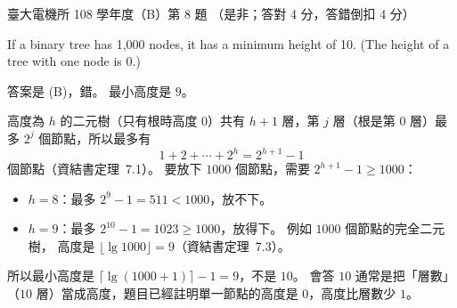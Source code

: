 \begin{pastexam}[label={px:ntu-108-ee-dsb-08}]{臺大電機所 108 學年度（B）第 8 題}
（是非；答對 4 分，答錯倒扣 4 分）

If a binary tree has 1,000 nodes, it has a minimum height of 10. (The height of a tree with one
node is 0.)
\end{pastexam}

\begin{pastsoln}
答案是 (B)，錯。 最小高度是 $9$。

高度為 $h$ 的二元樹（只有根時高度 $0$）共有 $h + 1$ 層，第 $j$ 層（根是第 $0$ 層）最多 $2^j$
個節點，所以最多有
\[
1 + 2 + \cdots + 2^h = 2^{h+1} - 1
\]
個節點（資結書定理~7.1）。 要放下 $1000$ 個節點，需要 $2^{h+1} - 1 \ge 1000$：
\begin{itemize}
\item $h = 8$：最多 $2^9 - 1 = 511 < 1000$，放不下。
\item $h = 9$：最多 $2^{10} - 1 = 1023 \ge 1000$，放得下。 例如 $1000$ 個節點的完全二元樹，
高度是 $\lfloor \lg 1000 \rfloor = 9$（資結書定理~7.3）。
\end{itemize}
所以最小高度是 $\lceil \lg(1000 + 1) \rceil - 1 = 9$，不是 $10$。 會答 $10$ 通常是把「層數」
（$10$ 層）當成高度，題目已經註明單一節點的高度是 $0$，高度比層數少 $1$。
\end{pastsoln}
